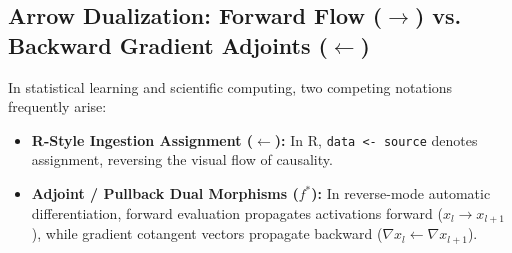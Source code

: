 \documentclass[11pt]{article}
\begin{document}
\subsection{Arrow Dualization: Forward Flow (\texorpdfstring{$\to$}{->}) vs. Backward Gradient Adjoints (\texorpdfstring{$\leftarrow$}{<-})}
In statistical learning and scientific computing, two competing notations frequently arise:
\begin{itemize}
    \item \textbf{R-Style Ingestion Assignment ($\leftarrow$):} In R, \texttt{data <- source} denotes assignment, reversing the visual flow of causality.
    \item \textbf{Adjoint / Pullback Dual Morphisms ($f^*$):} In reverse-mode automatic differentiation, forward evaluation propagates activations forward ($x_{l} \to x_{l+1}$), while gradient cotangent vectors propagate backward ($\nabla x_{l} \leftarrow \nabla x_{l+1}$).
\end{itemize}
\end{document}
